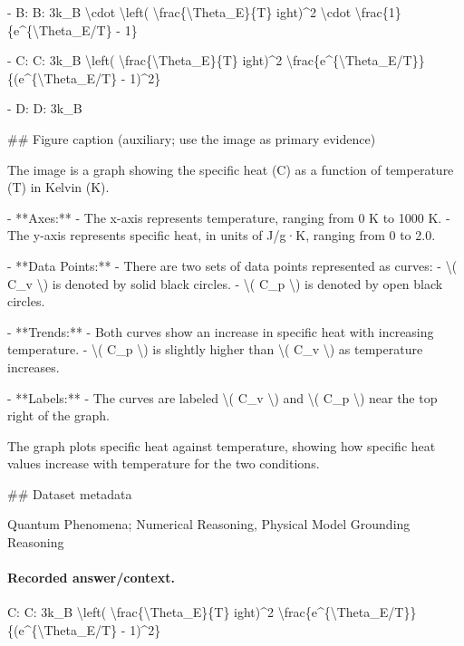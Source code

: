 - B: B: 3k\_B \textbackslash{}cdot \textbackslash{}left( \textbackslash{}frac\{\textbackslash{}Theta\_E\}\{T\} 
ight)\textasciicircum{}2 \textbackslash{}cdot \textbackslash{}frac\{1\}\{e\textasciicircum{}\{\textbackslash{}Theta\_E/T\} - 1\}

- C: C: 3k\_B \textbackslash{}left( \textbackslash{}frac\{\textbackslash{}Theta\_E\}\{T\} 
ight)\textasciicircum{}2 \textbackslash{}frac\{e\textasciicircum{}\{\textbackslash{}Theta\_E/T\}\}\{(e\textasciicircum{}\{\textbackslash{}Theta\_E/T\} - 1)\textasciicircum{}2\}

- D: D: 3k\_B

\#\# Figure caption (auxiliary; use the image as primary evidence)

The image is a graph showing the specific heat (C) as a function of temperature (T) in Kelvin (K). 

- **Axes:** 
  - The x-axis represents temperature, ranging from 0 K to 1000 K.
  - The y-axis represents specific heat, in units of J/g·K, ranging from 0 to 2.0.

- **Data Points:** 
  - There are two sets of data points represented as curves:
    - \textbackslash{}( C\_v \textbackslash{}) is denoted by solid black circles.
    - \textbackslash{}( C\_p \textbackslash{}) is denoted by open black circles.

- **Trends:**
  - Both curves show an increase in specific heat with increasing temperature.
  - \textbackslash{}( C\_p \textbackslash{}) is slightly higher than \textbackslash{}( C\_v \textbackslash{}) as temperature increases.

- **Labels:**
  - The curves are labeled \textbackslash{}( C\_v \textbackslash{}) and \textbackslash{}( C\_p \textbackslash{}) near the top right of the graph.

The graph plots specific heat against temperature, showing how specific heat values increase with temperature for the two conditions.

\#\# Dataset metadata

Quantum Phenomena; Numerical Reasoning, Physical Model Grounding Reasoning

\paragraph{Recorded answer/context.}
C: C: 3k\_B \textbackslash{}left( \textbackslash{}frac\{\textbackslash{}Theta\_E\}\{T\} 
ight)\textasciicircum{}2 \textbackslash{}frac\{e\textasciicircum{}\{\textbackslash{}Theta\_E/T\}\}\{(e\textasciicircum{}\{\textbackslash{}Theta\_E/T\} - 1)\textasciicircum{}2\}

